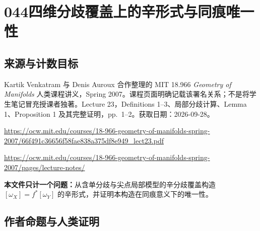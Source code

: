 \documentclass[UTF8,11pt]{ctexart}
\theoremstyle{definition}
\begin{document}
\section*{044\quad 四维分歧覆盖上的辛形式与同痕唯一性}
\subsection*{来源与计数目标}
Kartik Venkatram 与 Denis Auroux 合作整理的 MIT 18.966 \emph{Geometry of Manifolds} 人类课程讲义，Spring 2007。课程页面明确记载该署名关系；不是将学生笔记冒充授课者独著。Lecture 23，Definitions 1--3、局部分歧计算、Lemma 1、Proposition 1 及其完整证明，pp.~1--2。获取日期：2026-09-28。
\par\url{https://ocw.mit.edu/courses/18-966-geometry-of-manifolds-spring-2007/66f491c36656f58fae838a375df8e949_lect23.pdf}
\par\url{https://ocw.mit.edu/courses/18-966-geometry-of-manifolds-spring-2007/pages/lecture-notes/}
\par\textbf{本文件只计一个问题：}从含单分歧与尖点局部模型的辛分歧覆盖构造 $[\omega_X]=f^*[\omega_Y]$ 的辛形式，并证明本构造在同痕意义下的唯一性。
\subsection*{作者命题与人类证明}
\end{document}
